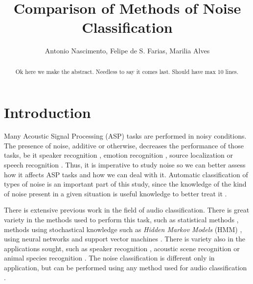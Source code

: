 \documentclass[12pt]{article}
\title{Comparison of Methods of Noise Classification}
\author{Antonio Nascimento\inst{1}, Felipe de S. Farias\inst{1}, Marilia Alves \inst{2}}
\begin{document}
 

\maketitle

\begin{abstract}


Ok here we make the abstract. Needless to say it comes last. Should have max 10 lines.

\end{abstract}
     


\section{Introduction} \label{sec:intro}




Many Acoustic Signal Processing (ASP) tasks are performed in noisy conditions. The presence of noise, additive or otherwise, decreases the performance of those tasks, be it speaker recognition \cite{ming2007robust}, emotion recognition \cite{schuller2010cross}, source localization \cite{benesty2000adaptive} or speech recognition \cite{friesen2001speech}. Thus, it is imperative to study noise so we can better assess how it affects ASP tasks and how we can deal with it. Automatic classification of types of noise is an important part of this study, since the knowledge of the kind of noise present in a given situation is useful knowledge to better treat it \cite{may2012noise}.

There is extensive previous work in the field of audio classification. There is great variety in the methods used to perform this task, such as statistical methods \cite{dal1988acoustic,peltonen2002computational}, methods using stochastical knowledge such as \textit{Hidden Markov Models} (HMM) \cite{ma2003context}, using neural networks \cite{beritelli2005adaptive} and support vector machines \cite{cumani2012analysis}. There is variety also in the applications sought, such as speaker recognition \cite{kinnunen2010overview,murty2006combining,farrell1994speaker}, acoustic scene recognition \cite{piczak2015environmental,barchiesi2015acoustic} or animal species recognition \cite{somervuo2006parametric,lee2008automatic}. The noise classification is different only in application, but can be performed using any method used for audio classification \cite{beritelli2007adaptive,ma2006acoustic}.
\end{document}
